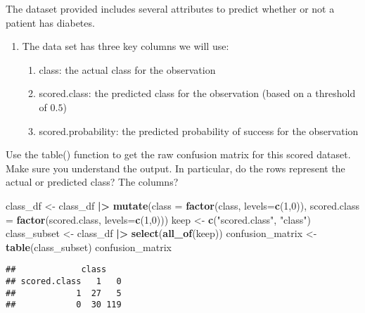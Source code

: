 \documentclass[
]{article}
\newenvironment{Shaded}{\begin{snugshade}}{\end{snugshade}}
\newcommand{\AttributeTok}[1]{\textcolor[rgb]{0.13,0.29,0.53}{#1}}
\newcommand{\DecValTok}[1]{\textcolor[rgb]{0.00,0.00,0.81}{#1}}
\newcommand{\FunctionTok}[1]{\textcolor[rgb]{0.13,0.29,0.53}{\textbf{#1}}}
\newcommand{\NormalTok}[1]{#1}
\newcommand{\OtherTok}[1]{\textcolor[rgb]{0.56,0.35,0.01}{#1}}
\newcommand{\SpecialCharTok}[1]{\textcolor[rgb]{0.81,0.36,0.00}{\textbf{#1}}}
\newcommand{\StringTok}[1]{\textcolor[rgb]{0.31,0.60,0.02}{#1}}
\begin{document}
The dataset provided includes several attributes to predict whether or
not a patient has diabetes.

\begin{enumerate}
\def\labelenumi{\arabic{enumi}.}
\setcounter{enumi}{1}
\item
  The data set has three key columns we will use:

  \begin{enumerate}
  \def\labelenumii{\alph{enumii}.}
  \item
    class: the actual class for the observation
  \item
    scored.class: the predicted class for the observation (based on a
    threshold of \(0.5\))
  \item
    scored.probability: the predicted probability of success for the
    observation
  \end{enumerate}
\end{enumerate}

Use the table() function to get the raw confusion matrix for this scored
dataset. Make sure you understand the output. In particular, do the rows
represent the actual or predicted class? The columns?

\begin{Shaded}
\begin{Highlighting}[]
\NormalTok{class\_df }\OtherTok{\textless{}{-}}\NormalTok{ class\_df }\SpecialCharTok{|\textgreater{}}
  \FunctionTok{mutate}\NormalTok{(}\AttributeTok{class =} \FunctionTok{factor}\NormalTok{(class, }\AttributeTok{levels=}\FunctionTok{c}\NormalTok{(}\DecValTok{1}\NormalTok{,}\DecValTok{0}\NormalTok{)),}
         \AttributeTok{scored.class =} \FunctionTok{factor}\NormalTok{(scored.class, }\AttributeTok{levels=}\FunctionTok{c}\NormalTok{(}\DecValTok{1}\NormalTok{,}\DecValTok{0}\NormalTok{)))}
\NormalTok{keep }\OtherTok{\textless{}{-}} \FunctionTok{c}\NormalTok{(}\StringTok{"scored.class"}\NormalTok{, }\StringTok{"class"}\NormalTok{)}
\NormalTok{class\_subset }\OtherTok{\textless{}{-}}\NormalTok{ class\_df }\SpecialCharTok{|\textgreater{}}
    \FunctionTok{select}\NormalTok{(}\FunctionTok{all\_of}\NormalTok{(keep))}
\NormalTok{confusion\_matrix }\OtherTok{\textless{}{-}} \FunctionTok{table}\NormalTok{(class\_subset)}
\NormalTok{confusion\_matrix}
\end{Highlighting}
\end{Shaded}

\begin{verbatim}
##             class
## scored.class   1   0
##            1  27   5
##            0  30 119
\end{verbatim}
\end{document}
